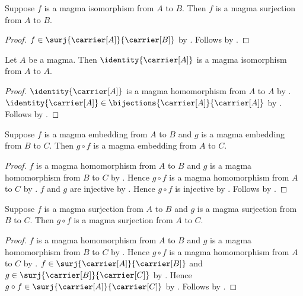 \begin{corollary}\label{magma_isomorphism_is_surjection}
    Suppose $f$ is a magma isomorphism from $A$ to $B$.
    Then $f$ is a magma surjection from $A$ to $B$.
\end{corollary}
\begin{proof}
    $f\in\surj{\carrier[A]}{\carrier[B]}$ by
        .
    Follows by
        .
\end{proof}

\begin{proposition}\label{identity_magma_isomorphism}
    Let $A$ be a magma.
    Then $\identity{\carrier[A]}$ is a magma isomorphism from $A$ to $A$.
\end{proposition}
\begin{proof}
    $\identity{\carrier[A]}$ is a magma homomorphism from $A$ to $A$ by
        .
    $\identity{\carrier[A]}\in
        \bijections{\carrier[A]}{\carrier[A]}$ by
        .
    Follows by .
\end{proof}

\begin{theorem}\label{magma_embedding_composition}
    Suppose $f$ is a magma embedding from $A$ to $B$ and
        $g$ is a magma embedding from $B$ to $C$.
    Then $g\circ f$ is a magma embedding from $A$ to $C$.
\end{theorem}
\begin{proof}
    $f$ is a magma homomorphism from $A$ to $B$ and
        $g$ is a magma homomorphism from $B$ to $C$ by
        .
    Hence $g\circ f$ is a magma homomorphism from $A$ to $C$ by
        .
    $f$ and $g$ are injective by
        .
    Hence $g\circ f$ is injective by .
    Follows by .
\end{proof}

\begin{theorem}\label{magma_surjection_composition}
    Suppose $f$ is a magma surjection from $A$ to $B$ and
        $g$ is a magma surjection from $B$ to $C$.
    Then $g\circ f$ is a magma surjection from $A$ to $C$.
\end{theorem}
\begin{proof}
    $f$ is a magma homomorphism from $A$ to $B$ and
        $g$ is a magma homomorphism from $B$ to $C$ by
        .
    Hence $g\circ f$ is a magma homomorphism from $A$ to $C$ by
        .
    $f\in\surj{\carrier[A]}{\carrier[B]}$ and
        $g\in\surj{\carrier[B]}{\carrier[C]}$ by
        .
    Hence $g\circ f\in\surj{\carrier[A]}{\carrier[C]}$ by
        .
    Follows by .
\end{proof}

